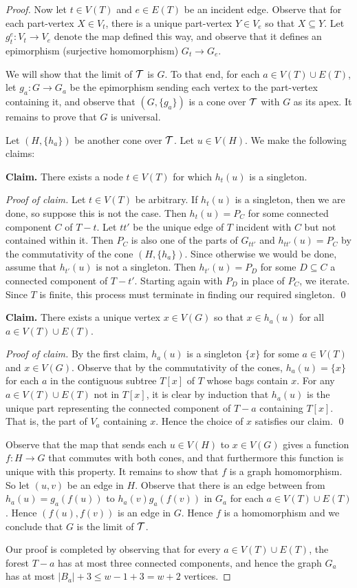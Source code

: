 \begin{proof}
    Now let $t\in V(T)$ and $e\in E(T)$ be an incident edge. Observe that for each part-vertex $X\in V_t$, there is a unique part-vertex $Y\in V_e$ so that $X\subseteq Y$. Let $g_t^e\colon V_t\to V_e$ denote the map defined this way, and observe that it defines an epimorphism (surjective homomorphism) $G_t\to G_e$.

    We will show that the limit of $\operatorname{\mathcal{T}}$ is $G$. To that end, for each $a\in V(T)\cup E(T)$, let $g_a\colon G\to G_a$ be the epimorphism sending each vertex to the part-vertex containing it, and observe that $(G,\{g_a\})$ is a cone over $\operatorname{\mathcal{T}}$ with $G$ as its apex. It remains to prove that $G$ is universal.
    
    Let $(H,\{h_a\})$ be another cone over $\operatorname{\mathcal{T}}$. Let $u\in V(H)$. We make the following claims:

    \textbf{Claim.} There exists a node $t\in V(T)$ for which $h_t(u)$ is a singleton.
    
    \textit{Proof of claim.} Let $t\in V(T)$ be arbitrary. If $h_t(u)$ is a singleton, then we are done, so suppose this is not the case. Then $h_t(u)=P_C$ for some connected component $C$ of $T-t$. Let $tt'$ be the unique edge of $T$ incident with $C$ but not contained within it. Then $P_C$ is also one of the parts of $G_{tt'}$ and $h_{tt'}(u)=P_C$ by the commutativity of the cone $(H,\{h_a\})$. Since otherwise we would be done, assume that $h_{t'}(u)$ is not a singleton. Then $h_{t'}(u)=P_D$ for some $D\subseteq C$ a connected component of $T-t'$. Starting again with $P_D$ in place of $P_C$, we iterate. Since $T$ is finite, this process must terminate in finding our required singleton.
    \qed

    \textbf{Claim.} There exists a unique vertex $x\in V(G)$ so that $x\in h_a(u)$ for all $a\in V(T)\cup E(T)$.
    
    \textit{Proof of claim.} By the first claim, $h_a(u)$ is a singleton $\{x\}$ for some $a\in V(T)$ and $x\in V(G)$. Observe that by the commutativity of the cones, $h_a(u)=\{x\}$ for each $a$ in the contiguous subtree $T[x]$ of $T$ whose bags contain $x$. For any $a\in V(T)\cup E(T)$ not in $T[x]$, it is clear by induction that $h_a(u)$ is the unique part representing the connected component of $T-a$ containing $T[x]$. That is, the part of $V_a$ containing $x$. Hence the choice of $x$ satisfies our claim.
    \qed

    Observe that the map that sends each $u\in V(H)$ to $x\in V(G)$ gives a function $f\colon H\to G$ that commutes with both cones, and that furthermore this function is unique with this property.
    It remains to show that $f$ is a graph homomorphism. So let $(u,v)$ be an edge in $H$. Observe that there is an edge between from $h_a(u)=g_a(f(u))$ to $h_a(v)g_a(f(v))$ in $G_a$ for each $a\in V(T)\cup E(T)$. Hence $(f(u),f(v))$ is an edge in $G$. Hence $f$ is a homomorphism and we conclude that $G$ is the limit of $\operatorname{\mathcal{T}}$.

    Our proof is completed by observing that for every $a\in V(T)\cup E(T)$, the forest $T-a$ has at most three connected components, and hence the graph $G_a$ has at most $|B_a|+3\le w-1+3=w+2$ vertices.
\end{proof}